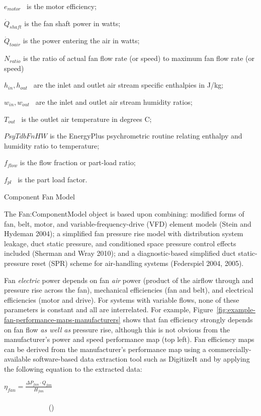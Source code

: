 \({e_{motor}}\) ~is the motor efficiency;

\({\dot Q_{shaft}}\) is the fan shaft power in watts;

\({\dot Q_{toair}}\) is the power entering the air in watts;

\({N_{ratio}}\) is the ratio of actual fan flow rate (or speed) to maximum fan flow rate (or speed)

\({h_{in}},{h_{out}}\) ~are the inlet and outlet air stream specific enthalpies in J/kg;

\({w_{in}},{w_{out}}\) ~are the inlet and outlet air stream humidity ratios;

\({T_{out}}\) ~is the outlet air temperature in degrees C;

\(PsyTdbFnHW\) is the EnergyPlus psychrometric routine relating enthalpy and humidity ratio to temperature;

\({f_{flow}}\) is the flow fraction or part-load ratio;

\({f_{pl}}\) ~is the part load factor.

Component Fan Model

The Fan:ComponentModel object is based upon combining: modified forms of fan, belt, motor, and variable-frequency-drive (VFD) element models (Stein and Hydeman 2004); a simplified fan pressure rise model with distribution system leakage, duct static pressure, and conditioned space pressure control effects included (Sherman and Wray 2010); and a diagnostic-based simplified duct static-pressure reset (SPR) scheme for air-handling systems (Federspiel 2004, 2005).

Fan \emph{electric} power depends on fan \emph{air} power (product of the airflow through and pressure rise across the fan), mechanical efficiencies (fan and belt), and electrical efficiencies (motor and drive). For systems with variable flows, none of these parameters is constant and all are interrelated. For example, Figure~\ref{fig:example-fan-performance-maps-manufacturers} shows that fan efficiency strongly depends on fan flow \emph{as well as} pressure rise, although this is not obvious from the manufacturer's power and speed performance map (top left). Fan efficiency maps can be derived from the manufacturer's performance map using a commercially-available software-based data extraction tool such as DigitizeIt and by applying the following equation to the extracted data:

\({\eta_{fan}} = \frac{{\Delta {P_{fan}} \cdot {Q_{fan}}}}{{{H_{fan}}}}\) ~~~~~~~~~~~~~~~~~~~~~~~~~~~~~~~~~~~~~~~~~~~~~~~~~~~~~~~~~~~~~~~~~~~~~~~~~~~~~~~~~~~~ ()

